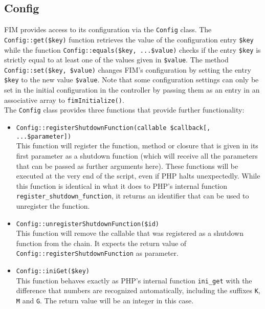 \documentclass{scrartcl}
\begin{document}
   \subsection{Config}
      FIM provides access to its configuration via the \lstinline!Config! class. The \lstinline!Config::get($key)! function retrieves the value of the configuration entry \lstinline!$key! while the function \lstinline!Config::equals($key, ...$value)! checks if the entry \lstinline!$key! is strictly equal to at least one of the values given in \lstinline!$value!. The method \lstinline!Config::set($key, $value)! changes FIM's configuration by setting the entry \lstinline!$key! to the new value \lstinline!$value!. Note that some configuration settings can only be set in the initial configuration in the controller by passing them as an entry in an associative array to \lstinline!fimInitialize()!. \\
      The \lstinline!Config! class provides three functions that provide further functionality:
      \begin{itemize}
         \item \lstinline!Config::registerShutdownFunction(callable $callback[, ...$parameter])! \\
            This function will register the function, method or closure that is given in its first parameter as a shutdown function (which will receive all the parameters that can be passed as further arguments here). These functions will be executed at the very end of the script, even if PHP halts unexpectedly. While this function is identical in what it does to PHP's internal function \lstinline!register_shutdown_function!, it returns an identifier that can be used to unregister the function.
         \item \lstinline!Config::unregisterShutdownFunction($id)! \\
            This function will remove the callable that was registered as a shutdown function from the chain. It expects the return value of \lstinline!Config::registerShutdownFunction! as parameter.
         \item \lstinline!Config::iniGet($key)! \\
            This function behaves exactly as PHP's internal function \lstinline!ini_get! with the difference that numbers are recognized automatically, including the suffixes \texttt{K}, \texttt{M} and \texttt{G}. The return value will be an integer in this case.
      \end{itemize}
\end{document}
